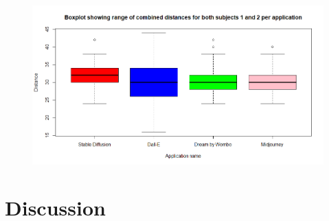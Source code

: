 \documentclass[]{report}
\begin{document}
	\begin{figure}
		\centering
		\includegraphics[width=1\linewidth]{boxplotWithAllData}
		\caption{}
		\label{fig:boxplotwithalldata}
	\end{figure}
	
	
	\section{Discussion}
	
\end{document}
